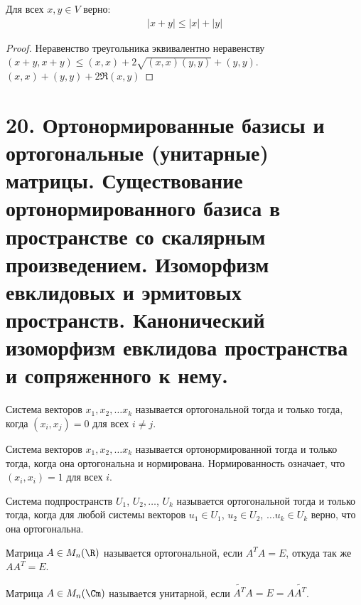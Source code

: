 \begin{corollary}
    Для всех $x, y \in V$ верно:
    \begin{gather*}
        |x + y| \leq |x| + |y|
    \end{gather*}
\end{corollary}

\begin{proof}
    Неравенство треугольника эквивалентно неравенству $(x +y, x+y) \leq (x, x) + 2\sqrt{(x, x)(y, y)} + (y, y)$.
    $(x, x) + (y, y) + 2 \Re (x, y)$
\end{proof}

\section{20. Ортонормированные базисы и ортогональные (унитарные) матрицы. Существование ортонормированного базиса в пространстве со скалярным произведением. Изоморфизм евклидовых и эрмитовых пространств. Канонический изоморфизм евклидова пространства и сопряженного к нему.}

\begin{definition}
    Система векторов $x_1, x_2, \dots x_k$ называется ортогональной тогда и только тогда, когда 
    $(x_i, x_j) = 0$ для всех $i \neq j$.
\end{definition}

\begin{definition}
    Система векторов $x_1, x_2, \dots x_k$ называется ортонормированной тогда и только тогда, когда 
    она ортогональна и нормирована. Нормированность означает, что $(x_i, x_i) = 1$ для всех $i$.
\end{definition}

\begin{definition}
    Система подпространств $U_1$, $U_2, \dots$, $U_k$ называется ортогональной тогда и только тогда,
    когда для любой системы векторов $u_1 \in U_1$, $u_2 \in U_2$, $\dots u_k \in U_k$ верно, 
    что она ортогональна.
\end{definition}

\begin{definition}
    Матрица $A \in M_n(\R)$ называется ортогональной, если $A^T A = E$, откуда так же $A A^T = E$.
\end{definition}

\begin{definition}
    Матрица $A \in M_n(\Cm)$ называется унитарной, если $\tilde{A^T} A = E = A \tilde{A^T}$.
\end{definition}
 
